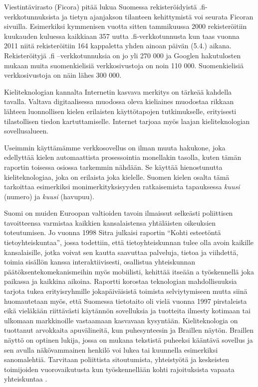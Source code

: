 \documentclass[]{../../metanetpaper}
\begin{document}
\begin{Parallel}[c]{70mm}{70mm}
{Viestintävirasto (Ficora) pitää lukua Suomessa rekisteröidyistä
.fi-verkkotunnuksista ja tietyn ajanjakson tilanteen kehittymistä voi
seurata Ficoran sivuilla. Esimerkiksi kymmenisen vuotta sitten
tammikuussa 2000 rekisteröitiin kuukauden kuluessa kaikkiaan 357 uutta
.fi-verkkotunnusta kun taas vuonna 2011 niitä rekisteröitiin 164
kappaletta yhden ainoan päivän (5.4.)  aikana. Rekisteröityjä .fi
–verkkotunnuksia on jo yli 270 000 ja Googlen hakutulosten mukaan
muita suomenkielisiä verkkosivustoja on noin 110 000.  Suomenkielisiä
verkkosivustoja on näin lähes 300 000.

Kieliteknologian kannalta Internetin kasvava merkitys on tärkeää
kahdella tavalla. Valtava digitaalisessa muodossa oleva kieliaines
muodostaa rikkaan lähteen luonnollisen kielen erilaisten käyttötapojen
tutkimukselle, erityisesti tilastollisen tiedon
kartuttamiselle. Internet tarjoaa myös laajan kieliteknologian
sovellusalueen.

Useimmin käyttämämme verkkosovellus on ilman muuta hakukone, joka
edellyttää kielen automaattista prosessointia monellakin tasolla,
kuten tämän raportin toisessa osiossa tarkemmin nähdään. Se käyttää
hienostunutta kieliteknologiaa, joka on erilaista joka
kielelle. Suomen kielen osalta tämä tarkoittaa esimerkiksi
monimerkityksisyyden ratkaisemista tapauksessa \textit{kuusi} (numero)
ja \textit{kuusi} (havupuu).

Suomi on muiden Euroopan valtioiden tavoin ilmaissut selkeästi
poliittisen tavoitteensa varmistaa kaikkien kansalaistensa yhtäläisten
oikeuksien toteutumisen. Jo vuonna 1998 Sitra julkaisi raportin “Kohti
esteetöntä tietoyhteiskuntaa”, jossa todettiin, että tietoyhteiskunnan
tulee olla avoin kaikille kansalaisille, jotka voivat sen kautta
saavuttaa palveluja, tietoa ja viihdettä, toimia sisällön kanssa
interaktiivisesti, osallistua yhteiskunnan päätöksentekomekanismeihin
myös mobiilisti, kehittää itseään a työskennellä joka paikassa ja
kaikkina aikoina. Raportti korostaa teknologian mahdollisuuksia
tarjota tukea erityisryhmille jokapäiväisistä toimista selviytymiseen
mutta siinä huomautetaan myös, että Suomessa tietotaito oli vielä
vuonna 1997 pirstaleista eikä vieläkään riittävästi käytännön
sovelluksia ja tuotteita ilmesty kotimaan tai ulkomaan markkinoille
vastaamaan kasvavaan kysyntään. Kieliteknologia on tuottanut
arvokkaita apuvälineitä, kun puhesynteesin ja Braillen
näytön. Braillen näyttö on optinen lukija, jossa on mukana tekstistä
puheeksi kääntävä sovellus ja sen avulla näkövammainen henkilö voi
lukea tai kuunnella esimerkiksi sanomalehtiä. Tarvitaan poliittista
sitoutumista, yhteistyötä ja keskeisten toimijoiden vuorovaikutusta
kun työskennellään kohti rajoituksista vapaata
yhteiskuntaa \cite{Sitra1998}.

}
\end{Parallel}
\end{document}
